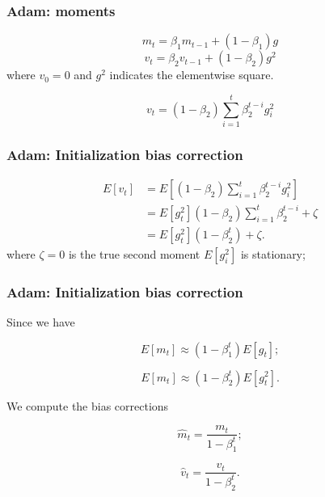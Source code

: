 \begin{frame}
  \frametitle{Adam: moments}

  \begin{equation}
    m_t = \beta_1 m_{t-1} + (1 - \beta_1) g
  \end{equation}
  \begin{equation}
    v_t = \beta_2 v_{t-1} + (1 - \beta_2) g^2
  \end{equation}
  where $v_0 = 0$ and $g^2$ indicates the elementwise square. 

  \begin{equation}
    v_t = (1 - \beta_2) \sum_{i = 1}^t \beta_2^{t-i} g_i^2
  \end{equation}

\end{frame}

\begin{frame}
  \frametitle{Adam: Initialization bias correction}

  \begin{align}
    E[v_t] &= 
    E \left[
      (1 - \beta_2) \sum_{i = 1}^t \beta_2^{t-i} g_i^2
    \right]
    \\
    & =  E[g_t^2] (1 - \beta_2) \sum_{i = 1}^t \beta_2^{t-i}  + \zeta
    \\
    & =  E[g_t^2] (1 - \beta_2^t) + \zeta.
  \end{align}
where $\zeta = 0$ is the true second moment  $E[g_i^2]$ is stationary; 


\end{frame}

\begin{frame}
  \frametitle{Adam: Initialization bias correction}

  Since we have 

  \begin{equation}
    E[m_t] \approx (1 - \beta_1^t) E[g_t];
  \end{equation}

  \begin{equation}
    E[m_t] \approx (1 - \beta_2^t) E[g_t^2].
  \end{equation}

  We compute the bias corrections

\begin{equation}
  \hat{m}_t = \frac{m_t}{1 - \beta_1^t};
\end{equation}

\begin{equation}
  \hat{v}_t = \frac{v_t}{1 - \beta_2^t}.
\end{equation}
\end{frame}

